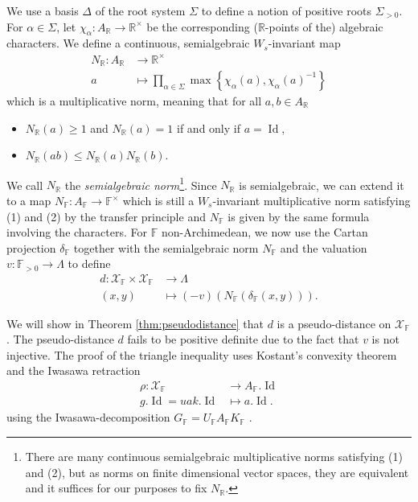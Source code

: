 \documentclass[12pt]{amsart}
\newcommand{\F}{\mathbb{F} }
\newcommand{\R}{\mathbb{R} }
\newcommand{\Z}{\mathbb{Z} }
\newcommand{\G}{\mathbb{G} }
\newcommand{\X}{\mathcal{X}}
\newcommand{\K}{\mathbb{K}}
\numberwithin{equation}{section}
\theoremstyle{remark} %
\begin{document}
We use a basis $\Delta$ of the root system $\Sigma$ to define a notion of positive roots $\Sigma_{>0}$. For $\alpha \in \Sigma$, let $\chi_\alpha \colon A_\R \to \R^\times$ be the corresponding ($\R$-points of the) algebraic characters. We define a continuous, semialgebraic $W_s$-invariant map
\begin{align*}
	N_{\R} \colon A_{\R} &\to \R^{\times} \\
	a & \mapsto  \prod_{\alpha \in \Sigma} \max \left\{\chi_\alpha(a), \chi_\alpha (a)^{-1}\right\}
\end{align*}
which is a multiplicative norm, meaning that for all $a,b \in A_{\R}$
\begin{itemize}
	\item [(1)] $N_{\R}(a)\geq 1$ and $N_{\R}(a) = 1$ if and only if $a=\operatorname{Id}$,
	\item [(2)] $N_{\R}(ab) \leq N_{\R}(a) N_{\R}(b)$.
\end{itemize}
We call $N_\R$ the \emph{semialgebraic norm}\footnote{There are many continuous semialgebraic multiplicative norms satisfying (1) and (2), but as norms on finite dimensional vector spaces, they are equivalent and it suffices for our purposes to fix $N_\R$.}.
Since $N_{\R}$ is semialgebraic, we can extend it to a map $N_{\F} \colon A_{\F} \to \F^{\times}$ which is still a $W_s$-invariant multiplicative norm satisfying (1) and (2) by the transfer principle and $N_\F$ is given by the same formula involving the characters.
For $\F$ non-Archimedean, we now use the Cartan projection $\delta_\F$ together with the semialgebraic norm $N_\F$ and the valuation $v \colon \F_{>0} \to \Lambda $ to define
\begin{align*}
	d \colon \X_\F \times \X_\F &\to \Lambda \\
	(x,y) &\mapsto (-v)(N_\F (\delta_{\F}(x,y))).
\end{align*}

We will show in Theorem \ref{thm:pseudodistance} that $d$ is a pseudo-distance on $\X_\F$. The pseudo-distance $d$ fails to be positive definite due to the fact that $v$ is not injective. The proof of the triangle inequality uses Kostant's convexity theorem and the Iwasawa retraction
\begin{align*}
	\rho \colon \X_\F &\to A_\F.\operatorname{Id} \\
	g.\operatorname{Id} = uak.\operatorname{Id} & \mapsto a.\operatorname{Id}.
\end{align*}
using the Iwasawa-decomposition $G_\F = U_\F A_\F K_\F$ \cite[Theorem \ref{I-thm:KAU}]{AppAGRCF}.
\end{document}

